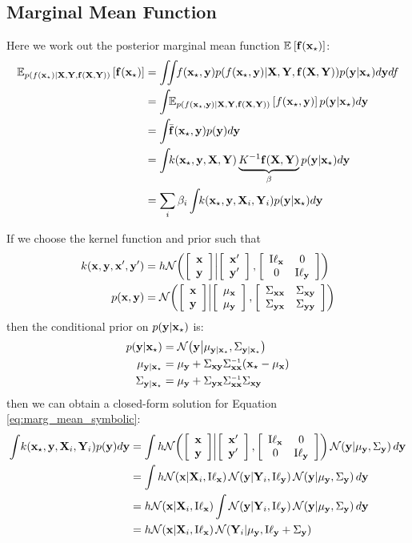 \subsection{Marginal Mean Function}
Here we work out the posterior marginal mean function $\mathbb{E}_{} \left[ {{\bf{f}}({\bf{x}}_\star)} \right]$:
\begin{align}
\expectargs{ p(f(\vx\st)|\vX, \vY, \vf(\vX, \vY))}{\vf(\vx\st)} & = \int\!\!\! \int\!\! f(\vx\st, \vy) p(f(\vx\st, \vy)|\vX, \vY, \vf(\vX, \vY)) p(\vy | \vx\st) d\vy df\\
& = \int\!\! \expectargs {p(f(\vx\st, \vy)|\vX, \vY, \vf(\vX, \vY))}{ f(\vx\st, \vy)} p(\vy | \vx\st) d\vy \\
& = \int\!\! \mf(\vx\st, \vy) p(\vy) d\vy \\
& = \int\!\! k(\vx\st, \vy, \vX, \vY) \underbrace{K^{-1} \vf(\vX, \vY)}_{\beta} p(\vy | \vx\st) d\vy \\
& = \sum_i \beta_i \int\!\! k(\vx\st, \vy, \vX_i, \vY_i) p(\vy | \vx\st) d\vy
\label{eq:marg_mean_symbolic}
\end{align} 

If we choose the kernel function and prior such that
\begin{align}
k({\bf{x}}, {\bf{y}}, {\bf{x}}', {\bf{y}}') & = h \mathcal{N}\!\left( \left[ \begin{array}{c} {{\bf{x}}} \\ {{\bf{y}}} \end{array} \right]  \middle|  \left[ \begin{array}{c} {{\bf{x}}'} \\ {{\bf{y}}'} \end{array} \right] ,  \left[ \begin{array}{cc} { {\text I} {\bf{\ell}}_{\bf{x}}} & { 0 } \\ { 0 } & { {\text I} {\bf{\ell}}_{\bf{y}}} \end{array} \right] \right)\\
 p({\bf{x}}, {\bf{y}}) & = \mathcal{N}\!\left( \left[ \begin{array}{c} {{\bf{x}}} \\ {{\bf{y}}} \end{array} \right]  \middle|  \left[ \begin{array}{c} {\mu_{\bf{x}}} \\ {\mu_{\bf{y}}} \end{array} \right] , \left[ \begin{array}{cc} { \Sigma_{{\bf{x}}{\bf{x}}} } & { \Sigma_{{\bf{x}} {\bf{y}}} } \\ { \Sigma_{{\bf{y}} {\bf{x}}} } & { \Sigma_{{\bf{y}} {\bf{y}}} } \end{array} \right]\right)
\end{align}
then the conditional prior on $p({\bf{y}} | {\bf{x}}_\star)$ is:
\begin{align}
 p(\vy | \vx\st) & = \N{ \vy }{ \mu_{\vy | \vx\st} }{ \Sigma_{\vy | \vx\st} } \\
 \mu_{\vy | \vx\st} & = \mu_\vy + \Sigma_{\vx \vy} \Sigma_{\vx \vx}\inv ( \vx\st - \mu_\vx)\\
 \Sigma_{\vy | \vx\st} & = \mu_\vy + \Sigma_{\vy \vx} \Sigma_{\vx \vx}\inv \Sigma_{\vx \vy}\
\end{align}
then we can obtain a closed-form solution for Equation \eqref{eq:marg_mean_symbolic}:
\begin{align}
\int\! k(\vx\st, \vy, \vX_i, \vY_i) p(\vy) d\vy & = \int h \N{ \colvec{\vx}{\vy} }{ \colvec{\vx'}{\vy'} }{  \tbtmat{ {\text I} \vell_\vx }{ 0 }{ 0 }{ {\text I} \vell_\vy} } \N{\vy}{\mu_\vy}{\Sigma_\vy} d\vy \\
 & = \int h \N{ \vx } {\vX_i}{ {\text I} \vell_\vx } \N{ \vy } {\vY_i}{ {\text I} \vell_\vy } \N{\vy}{\mu_\vy}{\Sigma_\vy} d\vy \\
 & = h \N{ \vx } {\vX_i}{ {\text I} \vell_\vx } \int \N{ \vy } {\vY_i}{ {\text I} \vell_\vy } \N{\vy}{\mu_\vy}{\Sigma_\vy} d\vy \\
 & = h \N{ \vx } {\vX_i}{ {\text I} \vell_\vx } \N{\vY_i}{\mu_\vy}{{\text I} \vell_\vy + \Sigma_\vy}
\label{eq:mean_double_integral}
\end{align} 

